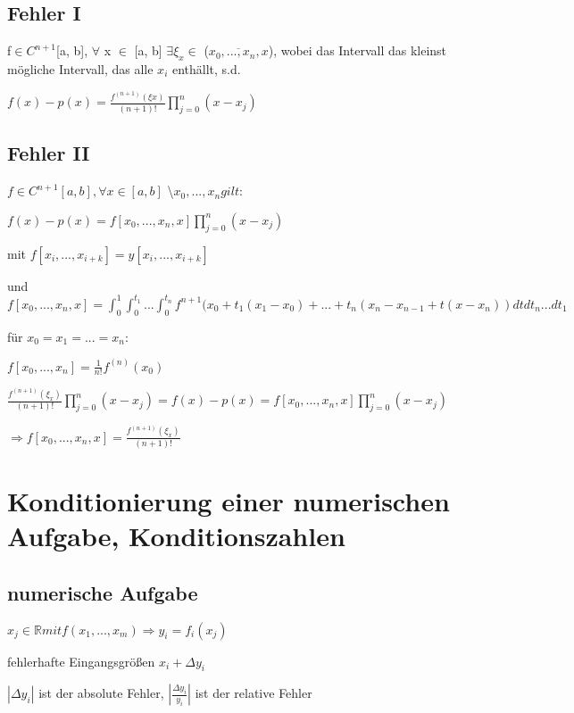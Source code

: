 \documentclass[12pt,a4paper]{article} %
\begin{document}
	\subsection{Fehler I}
	
	f$ \in C^{n+1}$[a, b], $\forall$ x $\in$ [a, b] $\exists \xi_x \in$ ($\overline{x_0, ..., x_n, x}$), wobei das Intervall das kleinst mögliche Intervall, das alle $x_i$ enthällt, s.d.
	
	$f(x) - p(x) = \frac{f^{(n+1)}(\xi x)}{(n+1)!} \prod_{j = 0}^{n}(x - x_j)$
	
	\subsection{Fehler II}
	
	$f \in C^{n + 1}[a, b], \forall x \in [a, b]$ \textbackslash ${x_0, ..., x_n} gilt:$
	
	$f(x) - p(x) = f[x_0, ..., x_n, x] \prod_{j = 0}^{n}(x - x_j)$
	
	mit $f[x_i, ..., x_{i + k}] = y[x_i, ..., x_{i + k}]$
	
	und $f[x_0, ..., x_n, x] = \int_{0}^{1}\int_{0}^{t_1}...\int_{0}^{t_n}f^{n+1}(x_0 + t_1(x_1 - x_0) + ... + t_n(x_n-x_{n - 1} + t(x - x_n))dtdt_n...dt_1$ 
	
	für $x_0 = x_1 = ... = x_n: $
	
	$f[x_0, ..., x_n] = \frac{1}{n!}f^{(n)}(x_0)$
	
	$\frac{f^{(n + 1)}(\xi_x)}{(n + 1)!} \prod_{j = 0}^{n} (x-x_j) = f(x) - p(x) = f[x_0, ..., x_n, x] \prod_{j = 0}^{n}(x - x_j)$
	
	$\Rightarrow f[x_0, ..., x_n, x] = \frac{f^{(n + 1)}(\xi_x)}{(n + 1)!}$
	
	\newpage
	
	\section{Konditionierung einer numerischen Aufgabe, Konditionszahlen}
	
	\subsection{numerische Aufgabe}
	
	$x_j \in \mathbb{R} mit f(x_1, ..., x_m) \Rightarrow y_i = f_i(x_j)$
	
	fehlerhafte Eingangsgrößen $x_i + \Delta y_i$
	
	$|\Delta y_i|$ ist der absolute Fehler, $|\frac{\Delta y_i}{y_i}|$ ist der relative Fehler
	
\end{document}
